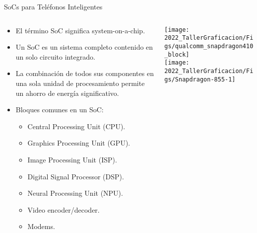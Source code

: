 \begin{frame}{SoCs para Teléfonos Inteligentes}
\begin{columns}
\begin{column}{0.60\textwidth}  
\begin{itemize}
\item El término SoC significa system-on-a-chip.
\item Un SoC es un sistema completo contenido en un solo circuito integrado.
\item La combinación de todos sus componentes en una sola unidad de procesamiento permite un ahorro de energía significativo. 
\item Bloques comunes en un SoC:
\begin{itemize}
\item Central Processing Unit (CPU).
\item Graphics Processing Unit (GPU).
\item Image Processing Unit (ISP).
\item Digital Signal Processor (DSP).
\item Neural Processing Unit (NPU).
\item Video encoder/decoder.
\item Modems.
\end{itemize}
\end{itemize}
\end{column}
\begin{column}{0.40\textwidth}  
    \begin{center}
\texttt{[image: 2022\_TallerGraficacion/Figs/qualcomm\_snapdragon410\_block]}\\
\texttt{[image: 2022\_TallerGraficacion/Figs/Snapdragon-855-1]}
     \end{center}
\end{column}
\end{columns}
\end{frame}


